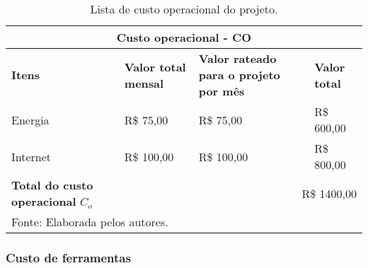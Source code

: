                 \begin{longtable}{|p{3cm}|p{3cm}|p{5cm}|p{3cm}|}
                
                    \caption[Lista de custo operacional do projeto.]{Lista de custo operacional do projeto.}
                
                    \hline
                
                    \multicolumn{4}{|c|}{
                        \textbf{Custo operacional - CO} \cellcolor{cinza_claro}
                    } \\ \hline
                
                    \textbf{Itens} \cellcolor{cinza_claro} &
                    \textbf{Valor total mensal} \cellcolor{cinza_claro} &
                    \textbf{Valor rateado para o projeto por mês} \cellcolor{cinza_claro} &
                    \textbf{Valor total} \cellcolor{cinza_claro} \\ \hline
                    
                    Energia & 
                    R\$ 75,00 &
                    R\$ 75,00 &
                    R\$ 600,00
                    \\ \hline
                    
                    Internet & 
                    R\$ 100,00 &
                    R\$ 100,00 &
                    R\$ 800,00
                    \\ \hline
                    
                    \textbf{Total do custo operacional} $C_o$ \cellcolor{cinza_claro} &
                    \multicolumn{3}{r|}{
                         \cellcolor{cinza_claro}
                         R\$ 1400,00
                    } \\ \hline
                
                    \multicolumn{4}{l}{Fonte: Elaborada pelos autores.}
                
                \end{longtable}
            
            \subsubsection*{Custo de ferramentas}        
                                
                \vspace{0.5cm}
                
